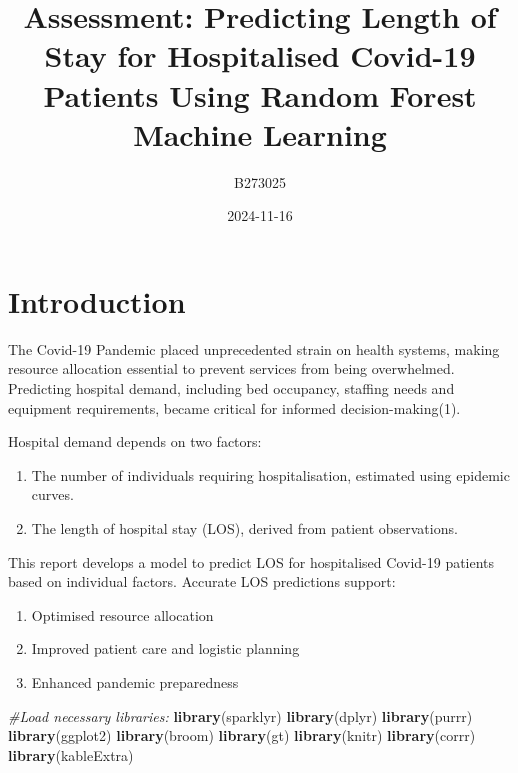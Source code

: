 \documentclass[
]{article}
\title{Assessment: Predicting Length of Stay for Hospitalised Covid-19
Patients Using Random Forest Machine Learning}
\author{B273025}
\date{2024-11-16}
\newenvironment{Shaded}{\begin{snugshade}}{\end{snugshade}}
\newcommand{\CommentTok}[1]{\textcolor[rgb]{0.56,0.35,0.01}{\textit{#1}}}
\newcommand{\FunctionTok}[1]{\textcolor[rgb]{0.13,0.29,0.53}{\textbf{#1}}}
\newcommand{\NormalTok}[1]{#1}
\begin{document}
\maketitle

\section{Introduction}\label{introduction}

The Covid-19 Pandemic placed unprecedented strain on health systems,
making resource allocation essential to prevent services from being
overwhelmed. Predicting hospital demand, including bed occupancy,
staffing needs and equipment requirements, became critical for informed
decision-making(1).

Hospital demand depends on two factors:

\begin{enumerate}
\def\labelenumi{\arabic{enumi}.}
\item
  The number of individuals requiring hospitalisation, estimated using
  epidemic curves.
\item
  The length of hospital stay (LOS), derived from patient observations.
\end{enumerate}

This report develops a model to predict LOS for hospitalised Covid-19
patients based on individual factors. Accurate LOS predictions support:

\begin{enumerate}
\def\labelenumi{\arabic{enumi}.}
\item
  Optimised resource allocation
\item
  Improved patient care and logistic planning
\item
  Enhanced pandemic preparedness
\end{enumerate}

\begin{Shaded}
\begin{Highlighting}[]
\CommentTok{\#Load necessary libraries:}
\FunctionTok{library}\NormalTok{(sparklyr)}
\FunctionTok{library}\NormalTok{(dplyr)}
\FunctionTok{library}\NormalTok{(purrr)}
\FunctionTok{library}\NormalTok{(ggplot2)}
\FunctionTok{library}\NormalTok{(broom)}
\FunctionTok{library}\NormalTok{(gt)}
\FunctionTok{library}\NormalTok{(knitr)}
\FunctionTok{library}\NormalTok{(corrr)}
\FunctionTok{library}\NormalTok{(kableExtra)}
\end{Highlighting}
\end{Shaded}
\end{document}
